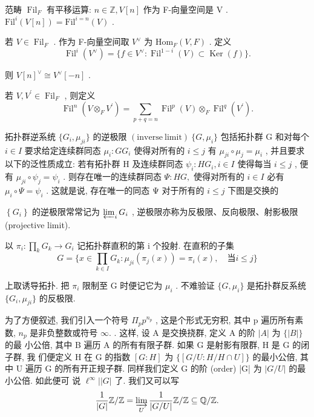 \documentclass[]{article}
\begin{document}
{范畴 $\operatorname { F i l } _ { F }$ 有平移运算: $n \in \mathbb { Z } , V [ n ]$ 作为 F-向量空间是 V . $\mathrm { F i l } ^ { i } ( V [ n ] ) = \mathrm { F i l } ^ { i = n } ( V )$ . 

若 $V \in \operatorname { F i l } _ { F }$ . 作为 F-向量空间取 $V ^ { \vee }$ 为 ${ \mathrm { H o m } } _ { F } ( V , F )$ . 定义  $$
\operatorname{Fil} ^ {i} (V ^ {\vee}) = \{f \in V ^ {\vee}: \operatorname{Fil} ^ {1 - i} (V) \subset \operatorname{Ker} (f) \}.
$$   

则 $V [ n ] ^ { \vee } \cong V ^ { \vee } [ - n ]$ . 

若 $V , V ^ { \prime } \in \operatorname { F i l } _ { F }$ , 则定义 $$
\operatorname{Fil} ^ {n} (V \otimes_ {F} V ^ {\prime}) = \sum_ {p + q = n} \operatorname{Fil} ^ {p} (V) \otimes_ {F} \operatorname{Fil} ^ {q} (V ^ {\prime}).
$$

拓扑群逆系统 $\{ G _ { i } , \mu _ { j i } \}$ 的逆极限 $\mathrm { ( i n v e r s e ~ l i m i t ) } \ \{ G , \mu _ { i } \}$ 包括拓扑群 G 和对每个 $i \in I$ 要求给定连续群同态 $\mu _ { i } : G  G _ { i }$ 使得对所有的 $i \leqslant j$ 有 $\mu _ { j i } \circ \mu _ { j } = \mu _ { i }$ , 并且要求 以下的泛性质成立: 若有拓扑群 H 及连续群同态 $\psi _ { i } : H  G _ { i } , i \in I$ 使得每当 $i \leqslant j$ , 便有 $\mu _ { j i } \circ \psi _ { j } = \psi _ { i }$ . 则存在唯一的连续群同态 $\Psi : H  G ,$ 使得对所有的 $i \in I$ 必有 $\mu _ { i } \circ \Psi = \psi _ { i }$ . 这就是说, 存在唯一的同态 Ψ 对于所有的 $i \leqslant j$ 下图是交换的 

$\left\{ G _ { i } \right\}$ 的逆极限常常记为 $\varprojlim _ { i } G _ { i }$ , 逆极限亦称为反极限、反向极限、射影极限 (projective limit). 

以 $\textstyle \pi _ { i } : \prod _ { k } G _ { k } \to G _ { i }$ 记拓扑群直积的第 i 个投射. 在直积的子集$$
G = \{x \in \prod_ {k \in I} G _ {k}: \mu_ {j i} (\pi_ {j} (x)) = \pi_ {i} (x), \quad {\text {当}} i \leqslant j \}
$$

上取诱导拓扑. 把 $\pi _ { i }$ 限制至 G 时便记它为 $\mu _ { i }$ . 不难验证 $\{ G , \mu _ { i } \}$ 是拓扑群反系统 $\{ G _ { i } , \mu _ { j i } \}$ 的反极限. 

为了方便叙述, 我们引入一个符号 $\Pi _ { p } p ^ { n _ { p } }$ , 这是个形式无穷积, 其中 p 遍历所有素 数, $n _ { p }$ 是非负整数或符号 $\infty .$ . 这样, 设 A 是交换挠群, 定义 A 的阶 $| A |$ 为 $\{ | B | \}$ 的最 小公倍, 其中 B 遍历 A 的所有有限子群. 如果 G 是射影有限群, H 是 G 的闭子群, 我 们便定义 H 在 G 的指数 $[ G : H ]$ 为 $\{ [ G / U : H / H \cap U ] \}$ 的最小公倍, 其中 U 遍历 G 的所有开正规子群. 同样我们定义 G 的阶 (order) |G| 为 $| G / U |$ 的最小公倍. 如此便可 说 $\ell ^ { \infty } | | G |$ 了. 我们又可以写  $$
\frac {1}{| G |} \mathbb {Z} / \mathbb {Z} = \varinjlim_ {U} \frac {1}{| G / U |} \mathbb {Z} / \mathbb {Z} \subseteq \mathbb {Q} / \mathbb {Z}.
$$

}
\end{document}
